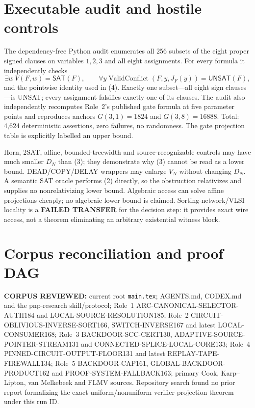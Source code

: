 \documentclass[11pt]{article}
\newcommand{\SAT}{\mathsf{SAT}}
\newcommand{\UNSAT}{\mathsf{UNSAT}}
\begin{document}
\section{Executable audit and hostile controls}
The dependency-free Python audit enumerates all 256 subsets of the eight
proper signed clauses on variables $1,2,3$ and all eight assignments.  For
every formula it independently checks
\[
 \exists w\ V(F,w)=\SAT(F),\qquad
 \forall y\operatorname{ValidConflict}(F,y,J_F(y))=\UNSAT(F),       \tag{5}
\]
and the pointwise identity used in (4).  Exactly one subset---all eight sign
clauses---is UNSAT; every assignment falsifies exactly one of its clauses.
The audit also independently recomputes Role~2's published gate formula at
five parameter points and reproduces anchors $G(3,1)=1824$ and
$G(3,8)=16888$.  Total: 4,624 deterministic assertions, zero failures, no
randomness.  The gate projection table is explicitly labelled an upper
bound.

Horn, 2SAT, affine, bounded-treewidth and source-recognizable controls may
have much smaller $D_N$ than (3); they demonstrate why (3) cannot be read as
a lower bound.  DEAD/COPY/DELAY wrappers may enlarge $V_N$ without changing
$D_N$.  A semantic SAT oracle performs (2) directly, so the obstruction
relativizes and supplies no nonrelativizing lower bound.  Algebraic access
can solve affine projections cheaply; no algebraic lower bound is claimed.
Sorting-network/VLSI locality is a \textbf{FAILED TRANSFER} for the decision
step: it provides exact wire access, not a theorem eliminating an arbitrary
existential witness block.

\section{Corpus reconciliation and proof DAG}
\textbf{CORPUS REVIEWED:} current root \texttt{main.tex}; AGENTS.md,
CODEX.md and the pnp-research skill/protocol; Role~1
ARC-CANONICAL-SELECTOR-AUTH184 and LOCAL-SOURCE-RESOLUTION185; Role~2
CIRCUIT-OBLIVIOUS-INVERSE-SORT166, SWITCH-INVERSE167 and latest
LOCAL-CONSUMER168; Role~3 BACKDOOR-SCC-CERT130,
ADAPTIVE-SOURCE-POINTER-STREAM131 and CONNECTED-SPLICE-LOCAL-CORE133;
Role~4 PINNED-CIRCUIT-OUTPUT-FLOOR131 and latest REPLAY-TAPE-FIREWALL134;
Role~5 BACKDOOR-CAP161, GLOBAL-BACKDOOR-PRODUCT162 and
PROOF-SYSTEM-FALLBACK163; primary Cook, Karp--Lipton, van Melkebeek and
FLMV sources.  Repository search found no prior report formalizing the exact
uniform/nonuniform verifier-projection theorem under this run ID.
\end{document}
